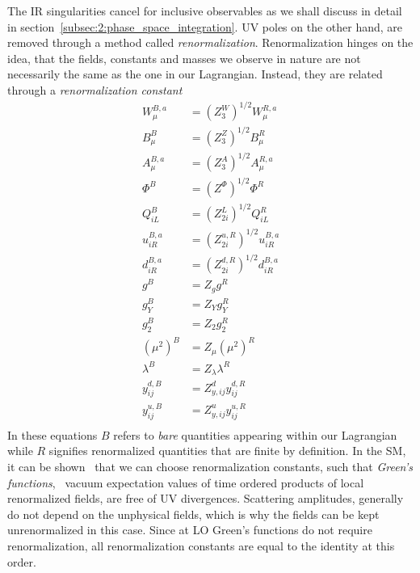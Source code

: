 The \acs{IR} singularities cancel for inclusive observables as we shall discuss in detail in section~\ref{subsec:2:phase_space_integration}. \acs{UV} poles on the other hand, are removed through a method called \textit{renormalization}. Renormalization hinges on the idea, that the fields, constants and masses we observe in nature are not necessarily the same as the one in our Lagrangian. Instead, they are related through a \textit{renormalization constant}
\begin{equation}
\begin{split}
W_\mu^{B,a} &= \left(Z_3^W \right)^{1/2} W_\mu^{R,a} \\
B_\mu^{B} &= \left(Z_3^Z \right)^{1/2} B_\mu^{R} \\
A_\mu^{B,a} &= \left(Z_3^A \right)^{1/2} A_\mu^{R,a} \\
\Phi^{B} &= \left(Z^\Phi \right)^{1/2} \Phi^{R} \\
Q_{iL}^{B} &= \left(Z_{2i}^L \right)^{1/2} Q_{iL}^{R} \\
u_{iR}^{B,a} &= \left(Z_{2i}^{u,R} \right)^{1/2} u_{iR}^{B,a} \\
d_{iR}^{B,a} &= \left(Z_{2i}^{d,R} \right)^{1/2} d_{iR}^{B,a} \\
g^B &= Z_g g^R \\
g_Y^B &= Z_Y g_Y^R \\
g_2^B &= Z_2 g_2^R \\
\left(\mu^2 \right)^B &= Z_\mu \left( \mu^2 \right)^R \\
\lambda^B &= Z_\lambda \lambda^R \\
y_{ij}^{d,B} &= Z_{y,ij}^{d} y_{ij}^{d,R} \\
y_{ij}^{u,B} &= Z_{y,ij}^{u} y_{ij}^{u,R} \\
\label{eq:2:renormalization}
\end{split}
\end{equation}
In these equations $B$ refers to \textit{bare} quantities appearing within our Lagrangian while $R$ signifies renormalized quantities that are finite by definition. In the \acs{SM}, it can be shown~\cite{tHooft:1971qjg,tHooft:1972tcz} that we can choose renormalization constants, such that \textit{Green's functions}, \ie\ vacuum expectation values of time ordered products of local renormalized fields, are free of \acs{UV} divergences. Scattering amplitudes, generally do not depend on the unphysical fields, which is why the fields can be kept unrenormalized in this case. Since at \acs{LO} Green's functions do not require renormalization, all renormalization constants are equal to the identity at this order.

